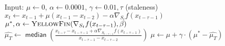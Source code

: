 \begin{algorithm}[h]
	\caption{\Asynctuner}
	\begin{algorithmic}[1]
	\State Input: $\mu\gets0$, $\alpha \gets 0.0001$, $\gamma\gets0.01, \tau$ (staleness)
	\State $x_t\!\gets\!x_{t - 1} + \mu (x_{t - 1} - x_{t - 2} ) - \alpha \nabla_{S_t} f(x_{t - \tau - 1} )$
	\State $\mu^*,\alpha \gets \Call{\tuner}{\nabla_{S_t} f(x_{t - \tau - 1} ), \beta}$ %
	\State $\hat{\mu_T} 
					\gets \mathop{\mathsf{median}}\left(
							\frac{x_{t - \tau} - x_{t - \tau-1} + \alpha \nabla_{S_{t-\tau-1}} f(x_{t - \tau - 1} )}
							{x_{t - \tau-1} - x_{t - \tau-2}}
					\right)$ 
	\State $\mu \leftarrow \mu + \gamma \cdot (\mu^* - \hat{\mu_T})$ 
	\EndFor
\end{algorithmic}
\label{alg:async-algo}
\end{algorithm}

